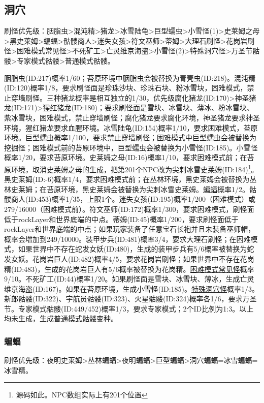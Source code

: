 \subsection{洞穴}
刷怪优先级：胭脂虫>混沌精>猪龙>冰雪陆龟>巨型蠕虫>小雪怪(1)>史莱姆之母>黑史莱姆>蝙蝠>骷髅商人>迷失女孩>符文巫师>蒂姆>大理石刷怪>花岗岩刷怪>困难模式常见怪>不死矿工>亡灵维京海盗>小雪怪(2)>特殊洞穴怪>万圣节骷髅>专家模式骷髅>普通模式骷髅。

胭脂虫(ID:217)概率1/60；苔原环境中胭脂虫会被替换为青壳虫(ID:218)。混沌精(ID:120)概率1/8，要求刷怪面是珍珠沙块、珍珠石块、粉冰雪块，困难模式，禁止穿墙刷怪。三种猪龙概率是相互独立的1/30，优先级腐化猪龙(ID:170)>神圣猪龙(ID:171)>猩红猪龙(ID:180)；要求刷怪面是雪块、冰雪块、薄冰、粉冰雪块、紫冰雪块，困难模式，禁止穿墙刷怪；腐化猪龙要求腐化环境，神圣猪龙要求神圣环境，猩红猪龙要求血腥环境。冰雪陆龟(ID:154)概率1/10，要求困难模式，苔原环境。巨型蠕虫概率1/100，要求禁止穿墙刷怪；困难模式中巨型蠕虫会被替换为挖掘怪；困难模式前的苔原环境中，巨型蠕虫会被替换为小雪怪(ID:185)。小雪怪概率1/20，要求苔原环境。史莱姆之母(ID:16)概率1/10，要求困难模式前；在苔原环境，取消史莱姆之母的生成，把第201个NPC改为尖刺冰雪史莱姆(ID:184)\footnote{源码如此。NPC数组实际上有201个位置}。黑史莱姆(ID:-6)概率1/4，要求困难模式前；在丛林环境，黑史莱姆会被替换为丛林史莱姆；在苔原环境，黑史莱姆会被替换为尖刺冰雪史莱姆。\hyperref[app18]{蝙蝠}概率1/2。骷髅商人(ID:453)概率1/35，上限1个。迷失女孩(ID:195)概率1/200（困难模式）或279/16000（困难模式前）。符文巫师(ID:172)概率1/300，要求困难模式，刷怪面低于rockLayer和世界底端的中点。蒂姆(ID:45)概率1/200，要求刷怪面低于rockLayer和世界底端的中点；如果玩家装备了任意宝石长袍并且未装备巫师帽，概率会增加到249/10000。装甲步兵(ID:481)概率3/4，要求大理石刷怪；在困难模式，如果世界中不存在蛇发女妖(ID:480)，生成的装甲步兵有5/6概率被替换为蛇发女妖。花岗岩巨人(ID:482)概率4/5，要求花岗岩刷怪；如果世界中不存在花岗精(ID:483)，生成的花岗岩巨人有5/6概率被替换为花岗精。\hyperref[app19]{困难模式常见怪}概率9/10。不死矿工(ID:44)概率1/20。如果刷怪面是雪块、冰雪块、薄冰，生成亡灵维京海盗(ID:167)。如果在苔原环境，生成小雪怪(ID:185)。\hyperref[app20]{特殊洞穴怪}概率1/3。新郎骷髅(ID:322)、宇航员骷髅(ID:323)、火星骷髅(ID:324)概率各1/6，要求万圣节。专家模式骷髅(ID:449/452)概率1/3，要求专家模式；2个ID比例为1:3。以上均未生成，生成\hyperref[app21]{普通模式骷髅}变种。

\subsubsection{蝙蝠}\label{app18}
刷怪优先级：夜明史莱姆>丛林蝙蝠>夜明蝙蝠>巨型蝙蝠>洞穴蝙蝠=冰雪蝙蝠=冰雪精。

